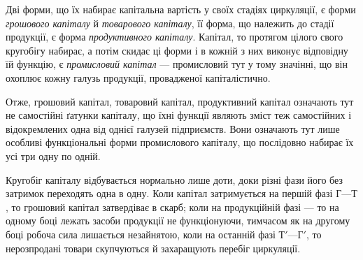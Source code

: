 Дві форми, що їх набирає капітальна вартість у своїх стадіях циркуляції,
є форми \emph{грошового капіталу} й \emph{товарового капіталу}, її форма,
що належить до стадії продукції, є форма \emph{продуктивного капіталу}.
Капітал, то протягом цілого свого кругобігу набирає, а потім скидає ці
форми і в кожній з них виконує відповідну їй функцію, є \emph{промисловий
капітал} — промисловий тут у тому значінні, що він охоплює кожну
галузь продукції, провадженої капіталістично.

Отже, грошовий капітал, товаровий капітал, продуктивний капітал
означають тут не самостійні ґатунки капіталу, що їхні функції являють
зміст теж самостійних і відокремлених одна від однієї галузей підприємств.
Вони означають тут лише особливі функціональні форми промислового
капіталу, що послідовно набирає їх усі три одну по одній.

Кругобіг капіталу відбувається нормально лише доти, доки різні фази
його без затримок переходять одна в одну. Коли капітал затримується
на першій фазі $Г — Т$, то грошовий капітал затвердіває в скарб;
коли на продукційній фазі — то на одному боці лежать засоби продукції
не функціонуючи, тимчасом як на другому боці робоча сила лишається
незайнятою, коли на останній фазі $Т' — Г'$, то нерозпродані товари
скупчуються й захаращують перебіг циркуляції.

